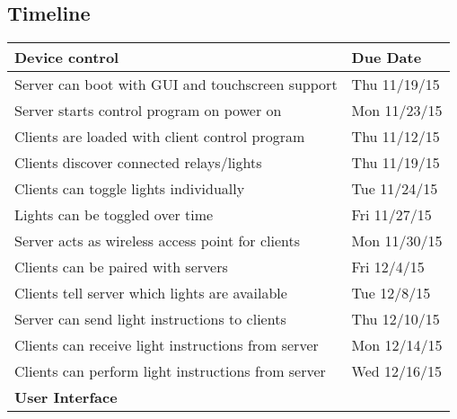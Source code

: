 \subsection{Timeline}
{\renewcommand{\arraystretch}{0.8}
\begin{tabular}{ | l | l | }
   \hline
   \textbf{Device control} & \textbf{Due Date} \\ \hline

   Server can boot with GUI and touchscreen support & Thu 11/19/15 \\ \hline
   Server starts control program on power on & Mon 11/23/15 \\ \hline
   Clients are loaded with client control program & Thu 11/12/15 \\ \hline
   Clients discover connected relays/lights & Thu 11/19/15 \\ \hline
   Clients can toggle lights individually & Tue 11/24/15 \\ \hline
   Lights can be toggled over time & Fri 11/27/15 \\ \hline
   Server acts as wireless access point for clients & Mon 11/30/15 \\ \hline
   Clients can be paired with servers & Fri 12/4/15 \\ \hline
   Clients tell server which lights are available & Tue 12/8/15 \\ \hline
   Server can send light instructions to clients & Thu 12/10/15 \\ \hline
   Clients can receive light instructions from server & Mon 12/14/15 \\ \hline
   Clients can perform light instructions from server & Wed 12/16/15 \\ \hline
   
   \textbf{User Interface} & \\ \hline
   

\end{tabular}}
